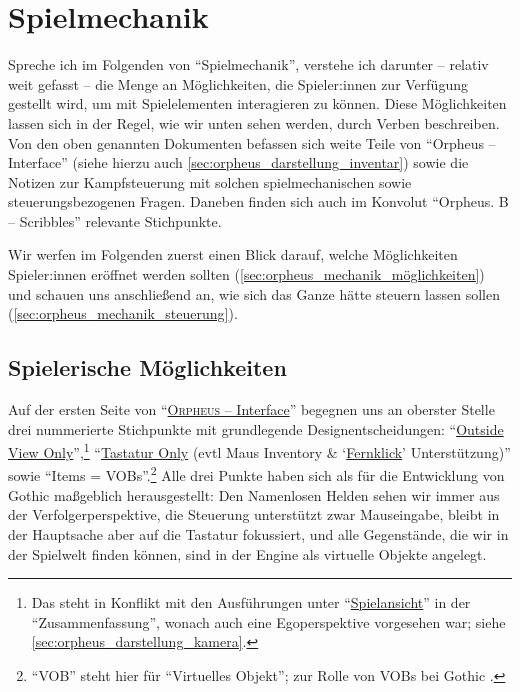 \documentclass[a5paper,pagesize,numbers=noenddot]{scrbook}
\begin{document}
\section{Spielmechanik}\label{sec:orpheus_mechanik}
Spreche ich im Folgenden von \enquote{Spielmechanik}, verstehe ich darunter -- relativ weit gefasst -- die Menge an Möglichkeiten, die Spieler:innen zur Verfügung gestellt wird, um mit Spielelementen interagieren zu können.\autocite[Vgl.][255]{jaervinen_games_2008}
Diese Möglichkeiten lassen sich in der Regel, wie wir unten sehen werden, durch Verben beschreiben.\autocite[Vgl.][263]{jaervinen_games_2008}
Von den oben genannten Dokumenten befassen sich weite Teile von \enquote{Orpheus -- Interface} (siehe hierzu auch \autoref{sec:orpheus_darstellung_inventar}) sowie die Notizen zur Kampfsteuerung mit solchen spielmechanischen sowie steuerungsbezogenen Fragen.
Daneben finden sich auch im Konvolut \enquote{Orpheus. B -- Scribbles} relevante Stichpunkte.

Wir werfen im Folgenden zuerst einen Blick darauf, welche Möglichkeiten Spieler:innen eröffnet werden sollten (\autoref{sec:orpheus_mechanik_möglichkeiten}) und schauen uns anschließend an, wie sich das Ganze hätte steuern lassen sollen (\autoref{sec:orpheus_mechanik_steuerung}).


\subsection{Spielerische Möglichkeiten}\label{sec:orpheus_mechanik_möglichkeiten}
Auf der ersten Seite von \enquote{\uline{\textsc{Orpheus} -- Interface}} begegnen uns an oberster Stelle drei nummerierte Stichpunkte mit grundlegende Designentscheidungen:
\enquote{\uline{Outside View Only}},\footnote{Das steht in Konflikt mit den Ausführungen unter \enquote{\uline{Spielansicht}} in der \enquote{Zusammenfassung}, wonach auch eine Egoperspektive vorgesehen war; siehe \autoref{sec:orpheus_darstellung_kamera}.} \enquote{\uline{Tastatur Only} (evtl Maus Inventory \& \enquote{\uline{Fernklick}} Unterstützung)} sowie \enquote{Items = VOBs}.\footnote{\enquote{VOB} steht hier für \enquote{Virtuelles Objekt}; zur Rolle von VOBs bei Gothic \autocite[vgl.][]{wiki_vob}.}
Alle drei Punkte haben sich als für die Entwicklung von Gothic maßgeblich herausgestellt:
Den Namenlosen Helden sehen wir immer aus der Verfolgerperspektive, die Steuerung unterstützt zwar Mauseingabe, bleibt in der Hauptsache aber auf die Tastatur fokussiert, und alle Gegenstände, die wir in der Spielwelt finden können, sind in der Engine als virtuelle Objekte angelegt.
\end{document}
